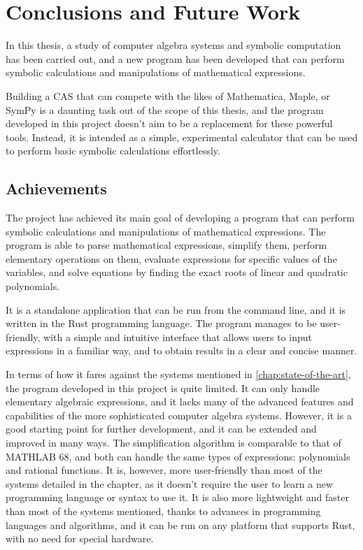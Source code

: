 \chapter{Conclusions and Future Work}\label{chap:conclusions}

In this thesis, a study of computer algebra systems and symbolic computation has been carried out, and a new program has been developed that can perform symbolic calculations and manipulations of mathematical expressions.

Building a CAS that can compete with the likes of Mathematica, Maple, or SymPy is a daunting task out of the scope of this thesis, and the program developed in this project doesn't aim to be a replacement for these powerful tools. Instead, it is intended as a simple, experimental calculator that can be used to perform basic symbolic calculations effortlessly.

\section{Achievements}\label{sec:results}

The project has achieved its main goal of developing a program that can perform symbolic calculations and manipulations of mathematical expressions. The program is able to parse mathematical expressions, simplify them, perform elementary operations on them, evaluate expressions for specific values of the variables, and solve equations by finding the exact roots of linear and quadratic polynomials.

It is a standalone application that can be run from the command line, and it is written in the Rust programming language. The program manages to be user-friendly, with a simple and intuitive interface that allows users to input expressions in a familiar way, and to obtain results in a clear and concise manner.

In terms of how it fares against the systems mentioned in \ref{chap:state-of-the-art}, the program developed in this project is quite limited. It can only handle elementary algebraic expressions, and it lacks many of the advanced features and capabilities of the more sophisticated computer algebra systems. However, it is a good starting point for further development, and it can be extended and improved in many ways. The simplification algorithm is comparable to that of MATHLAB 68, and both can handle the same types of expressions: polynomials and rational functions. It is, however, more user-friendly than most of the systems detailed in the chapter, as it doesn't require the user to learn a new programming language or syntax to use it. It is also more lightweight and faster than most of the systems mentioned, thanks to advances in programming languages and algorithms, and it can be run on any platform that supports Rust, with no need for special hardware.

